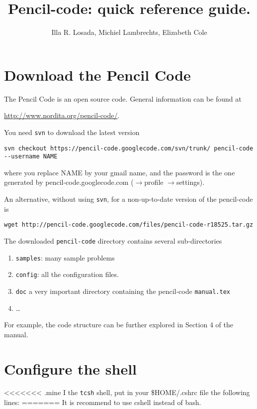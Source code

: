 \documentclass[a4paper,12pt]{article}
\title{Pencil-code: quick reference guide.}
\author{Illa R. Losada, Michiel Lambrechts, Elizabeth Cole }
\begin{document}
\maketitle

\tableofcontents

\newpage

\section{Download the Pencil Code}
The Pencil Code is an open source code. General information can be found at

\url{http://www.nordita.org/pencil-code/}.


You need \verb|svn| to download the latest version 
\begin{verbatim}
svn checkout https://pencil-code.googlecode.com/svn/trunk/ pencil-code
--username NAME
\end{verbatim}

where you replace NAME by your gmail name, and the password is the
one generated by pencil-code.googlecode.com ($\rightarrow$profile
$\rightarrow$settings). 

An alternative, without using \verb|svn|, for a non-up-to-date version of the pencil-code is
\begin{verbatim}
wget http://pencil-code.googlecode.com/files/pencil-code-r18525.tar.gz
\end{verbatim}


The downloaded \verb|pencil-code| directory contains several sub-directories
\begin{enumerate}
  \item \verb|samples|:  many sample problems
  \item \verb|config|: all the configuration files.
  \item \verb|doc| a very important directory containing the pencil-code
    \verb|manual.tex|
  \item \dots
\end{enumerate}
For example, the code structure can be further explored in Section 4 of the
manual.

\section{Configure the shell}

<<<<<<< .mine
I the \verb|tcsh| shell, put in your \$HOME/.cshrc file the following lines:
=======
It is recommend to use cshell instead of bash.
\end{document}

